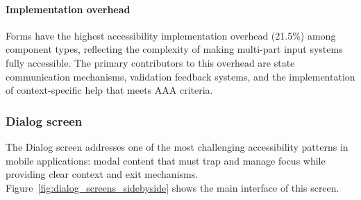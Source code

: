 \paragraph{Implementation overhead}

Forms have the highest accessibility implementation overhead (21.5\%) among component types, reflecting the complexity of making multi-part input systems fully accessible. The primary contributors to this overhead are state communication mechanisms, validation feedback systems, and the implementation of context-specific help that meets AAA criteria.

\subsubsection{Dialog screen}
\label{subsubsec:dialogs-screen}

The Dialog screen addresses one of the most challenging accessibility patterns in mobile applications: modal content that must trap and manage focus while providing clear context and exit mechanisms. Figure~\ref{fig:dialog_screens_sidebyside} shows the main interface of this screen.

